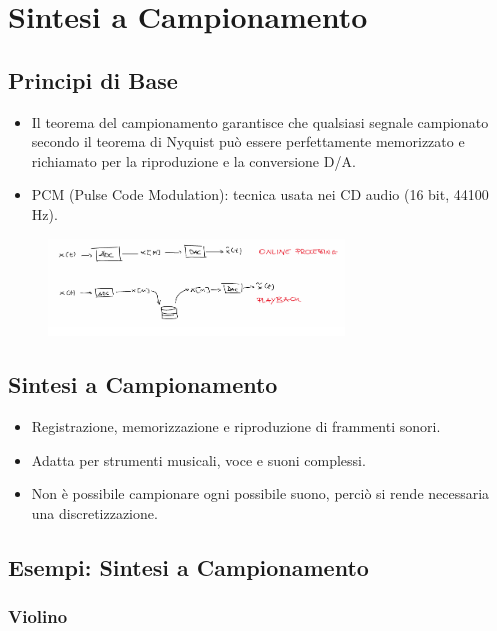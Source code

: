 
\chapter{Sintesi a Campionamento}


\section{Principi di Base}

\begin{itemize}
    \item Il teorema del campionamento garantisce che qualsiasi segnale campionato secondo il teorema di Nyquist può essere perfettamente memorizzato e richiamato per la riproduzione e la conversione D/A.
    \item PCM (Pulse Code Modulation): tecnica usata nei CD audio (16 bit, 44100 Hz).
\end{itemize}
\begin{figure}[H]
    \centering
    \includegraphics[width=0.7\textwidth]{capitoli/capitolo13/immagini/image1.png}
\end{figure}

\section{Sintesi a Campionamento}

\begin{itemize}
    \item Registrazione, memorizzazione e riproduzione di frammenti sonori.
    \item Adatta per strumenti musicali, voce e suoni complessi.
    \item Non è possibile campionare ogni possibile suono, perciò si rende necessaria una discretizzazione.
\end{itemize}

\section{Esempi: Sintesi a Campionamento}

\subsection{Violino}

